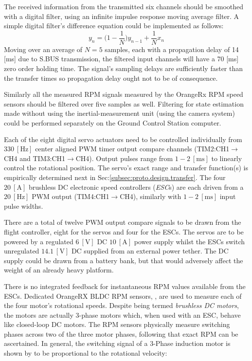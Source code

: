 \par
{\color{red}
The received information from the transmitted six channels should be smoothed with a digital filter, using an infinite impulse response moving average filter. A simple digital filter's difference equation could be implemented as follows: 
\begin{equation}
y_n = \big(1-\frac{1}{N}\big)y_{n-1}+\frac{1}{N}x_n
\end{equation}
Moving over an average of $N=5$ samples, each with a propagation delay of 14 [ms] due to S.BUS transmission, the filtered input channels will have a 70 [ms] zero order holding time. The signal's sampling delays are sufficiently faster than the transfer times so propagation delay ought not to be of consequence.
\par
Similarly all the measured RPM signals measured by the OrangeRx RPM speed sensors should be filtered over five samples as well. Filtering for state estimation made without using the inertial-measurement unit (using the camera system) could be performed separately on the Ground Control Station computer.}
\par
Each of the eight digital servo actuators need to be controlled individually from $330~[\text{Hz}]$ center aligned PWM timer output compare channels (TIM2:CH1$\rightarrow$CH4 and TIM3:CH1$\rightarrow$CH4). Output pulses range from $1-2~[\text{ms}]$ to linearly control the rotational position. The servo's exact range and transfer function(s) is empirically determined next in Sec:\ref{subsec:proto.design.transfer}. The four $20~[\text{A}]$ brushless DC electronic speed controllers (\emph{ESC}s) are each driven from a $20~[\text{Hz}]$ PWM output (TIM4:CH1$\rightarrow$CH4), similarly with $1-2~[\text{ms}]$ input pulse widths. 
\par
There are a total of twelve PWM output compare signals to be drawn from the flight controller, eight for the servos and four for the ESCs. The servos are to be powered by a regulated $6~[\text{V}]$ DC $10~[\text{A}]$ power supply \cite{rotorstar} whilst the ESCs switch unregulated $14.1~[\text{V}]$ DC supplied from an external power tether. The DC supply could be drawn from a battery bank, but that would adversely affect the weight of an already heavy platform.
\par
There is no integrated feedback for instantaneous RPM values available from the ESCs. Dedicated OrangeRX BLDC RPM sensors, \cite{orangerpm}, are used to measure each of the four motor's rotational speeds. Despite being termed \emph{brushless DC motors}, the motors are actually 3-phase motors which, when used with an ESC, behave like closed-loop DC motors. The RPM sensors physically measure switching phases across two of the three motor phases, following that exact RPM can be ascertained. In general, the switching signal of a 3-Phase induction motor is shown by \cite{vfd} to be proportional to the rotational velocity:
